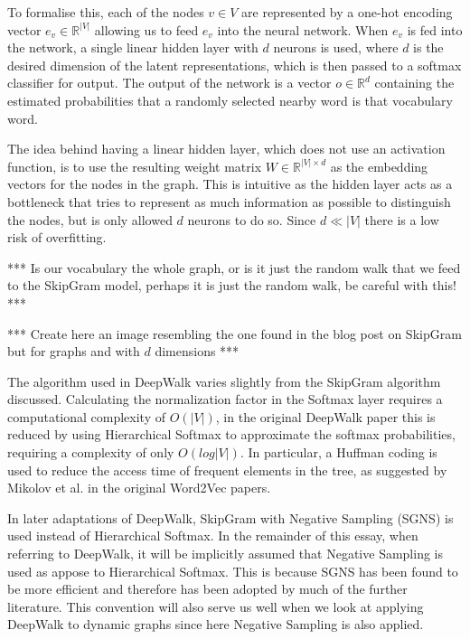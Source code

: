 \documentclass[a4paper]{article}
\begin{document}
To formalise this, each of the nodes $v \in V$ are represented by a one-hot
encoding vector $e_v \in \mathbb{R}^{|V|}$ allowing us to feed $e_v$ into the
neural network. When $e_v$ is fed into the network, a single linear hidden layer with
$d$ neurons is used, where $d$ is the desired dimension of the latent
representations, which is then passed to a softmax classifier for output. The
output of the network is a vector $o \in \mathbb{R}^d$ containing the estimated
probabilities that a randomly selected nearby word is that vocabulary word.

The idea behind having a linear hidden layer, which does not use an activation
function, is to use the resulting weight matrix $W \in \mathbb{R}^{|V| \times
  d}$ as the embedding vectors for the nodes in the graph. This is intuitive as
the hidden layer acts as a bottleneck that tries to represent as much
information as possible to distinguish the nodes, but is only allowed $d$
neurons to do so. Since $d \ll |V|$ there is a low risk of overfitting.

*** Is our vocabulary the whole graph, or is it just the random walk that we
feed to the SkipGram model, perhaps it is just the random walk, be careful with
this! ***

*** Create here an image resembling the one found in the blog post on SkipGram
but for graphs and with $d$ dimensions ***

The algorithm used in DeepWalk varies slightly from the SkipGram algorithm
discussed. Calculating the normalization factor in the Softmax layer requires a
computational complexity of $O(|V|)$, in the original DeepWalk paper this is
reduced by using Hierarchical Softmax to approximate the softmax probabilities,
requiring a complexity of only $O(log|V|)$. In particular, a Huffman coding is
used to reduce the access time of frequent elements in the tree, as suggested by
Mikolov et al. in the original Word2Vec
papers.\cite{mikolov2013distributed,mikolov2013efficient}

In later adaptations of DeepWalk, SkipGram with Negative Sampling (SGNS) is used instead of
Hierarchical Softmax. In the remainder of this essay, when referring to DeepWalk, it will be
implicitly assumed that Negative Sampling is used as appose to Hierarchical
Softmax. This is because SGNS has been found to be more efficient
and therefore has been adopted by much of the further literature. This convention will also
serve us well when we look at applying DeepWalk to dynamic graphs since here
Negative Sampling is also applied.\\
\end{document}
